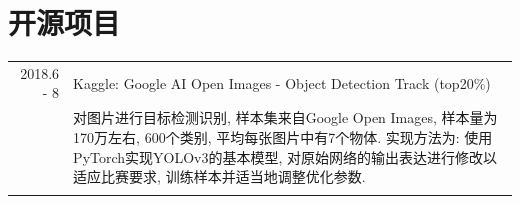\documentclass[a4paper,11pt]{article}
\begin{document}
\section{开源项目}
\begin{tabular}{r|p{11cm}}
\textsc{2018.6 - 8} & Kaggle: Google AI Open Images - Object Detection Track (top20\%)\\&\footnotesize{对图片进行目标检测识别, 样本集来自Google Open Images, 样本量为170万左右, 600个类别, 平均每张图片中有7个物体. 实现方法为: 使用PyTorch实现YOLOv3的基本模型, 对原始网络的输出表达进行修改以适应比赛要求, 训练样本并适当地调整优化参数.}\\\multicolumn{2}{c}{} \\
\end{tabular}
\end{document}
